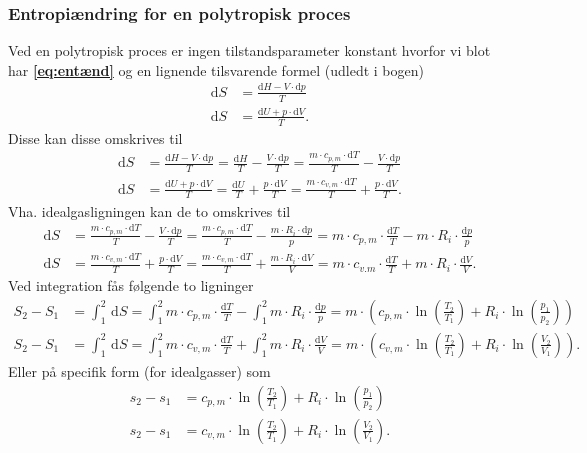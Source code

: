 \subsubsection{Entropiændring for en polytropisk proces}
Ved en polytropisk proces er ingen tilstandsparameter konstant hvorfor vi blot har \textbf{\autoref{eq:entænd}} og en lignende tilsvarende formel (udledt i bogen)
\begin{align*}
  \mathrm{d}S &= \frac{\mathrm{d}H - V \cdot \mathrm{d}p}{T} \\
  \mathrm{d}S &= \frac{\mathrm{d}U + p \cdot \mathrm{d}V}{T}
.\end{align*}
Disse kan disse omskrives til
\begin{align*}
  \mathrm{d}S &= \frac{\mathrm{d}H - V\cdot \mathrm{d}p}{T} = \frac{\mathrm{d}H}{T} - \frac{V \cdot \mathrm{d}p}{T} = \frac{m \cdot c_{p,m}\cdot \mathrm{d}T}{T} - \frac{V\cdot \mathrm{d}p}{T} \\
  \mathrm{d}S &= \frac{\mathrm{d}U + p \cdot \mathrm{d}V}{T} = \frac{\mathrm{d}U}{T} + \frac{p \cdot \mathrm{d}V}{T} = \frac{m \cdot c_{v,m}\cdot \mathrm{d}T}{T} + \frac{p \cdot \mathrm{d}V}{T}
.\end{align*}
Vha. idealgasligningen kan de to omskrives til
\begin{align*}
  \mathrm{d}S &= \frac{m \cdot c_{p,m} \cdot \mathrm{d}T}{T} - \frac{V \cdot \mathrm{d}p}{T} = \frac{m \cdot c_{p,m} \cdot \mathrm{d}T}{T} - \frac{m \cdot R_i \cdot \mathrm{d}p}{p} = m \cdot c_{p,m} \cdot \frac{\mathrm{d}T}{T} - m \cdot R_i \cdot \frac{\mathrm{d}p}{p} \\
  \mathrm{d}S &= \frac{m \cdot c_{v,m} \cdot \mathrm{d}T}{T} + \frac{p \cdot \mathrm{d}V}{T} = \frac{m \cdot c_{v,m} \cdot \mathrm{d}T}{T} + \frac{m \cdot R_i \cdot \mathrm{d}V}{V} = m \cdot c_{v.m} \cdot \frac{\mathrm{d}T}{T} + m \cdot R_i \cdot \frac{\mathrm{d}V}{V}
.\end{align*}
Ved integration fås følgende to ligninger
\begin{align*}
  S_2 - S_1 &= \int_{1}^{2} \, \mathrm{d}S = \int_{1}^{2} m \cdot c_{p,m} \cdot \frac{\mathrm{d}T}{T} - \int_{1}^{2} m \cdot R_i \cdot \frac{\mathrm{d}p}{p} = m \cdot  \left( c_{p,m} \cdot \ln \left( \frac{T_2}{T_1} \right) + R_i \cdot \ln \left( \frac{p_1}{p_2} \right) \right)\\
  S_2 - S_1 &= \int_{1}^{2} \, \mathrm{d}S = \int_{1}^{2} m \cdot c_{v,m} \cdot \frac{\mathrm{d}T}{T} + \int_{1}^{2} m \cdot R_i \cdot \frac{\mathrm{d}V}{V} = m \cdot \left( c_{v,m} \cdot \ln \left( \frac{T_2}{T_1} \right) + R_i \cdot \ln \left( \frac{V_2}{V_1} \right) \right)
.\end{align*}
Eller på specifik form (for idealgasser) som
\begin{align*}
  s_2 - s_1 &= c_{p,m} \cdot \ln \left( \frac{T_2}{T_1} \right) + R_i \cdot \ln \left( \frac{p_1}{p_2} \right) \\
  s_2 - s_1 &= c_{v,m} \cdot \ln \left( \frac{T_2}{T_1} \right) + R_i \cdot \ln \left( \frac{V_2}{V_1} \right)
.\end{align*}

